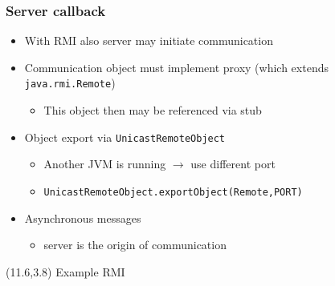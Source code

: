 \documentclass[10pt,xcolor=pdflatex]{beamer}
\begin{document}
\begin{frame}[containsverbatim]\frametitle{Server callback}
\begin{itemize}
	\item With RMI also server may initiate communication
	\item Communication object must implement proxy (which extends \texttt{java.rmi.Remote})
      \begin{itemize}
    	\item This object then may be referenced via stub
      \end{itemize}
    \item Object export via \texttt{UnicastRemoteObject}
      \begin{itemize}
        \item Another JVM is running $\rightarrow$ use different port
        \item \texttt{UnicastRemoteObject.exportObject(Remote,PORT)}
        \end{itemize}
    \item Asynchronous messages
      \begin{itemize}
    	\item server is the origin of communication 
      \end{itemize}
\end{itemize}
\begin{textblock}{5}(11.6,3.8)
    {\footnotesize Example RMI}
\end{textblock}
\end{frame}
\end{document}
